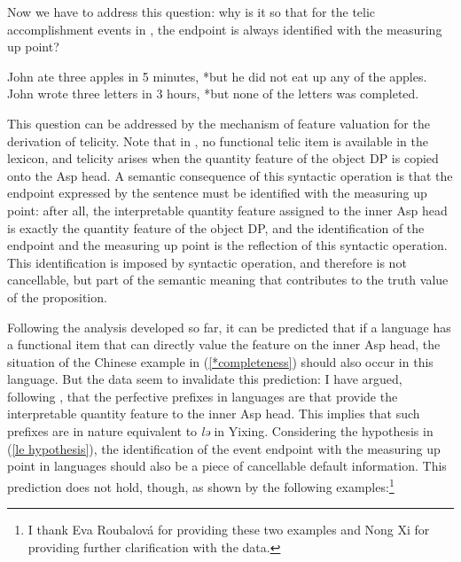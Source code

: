 \documentclass[output=paper]{langsci/langscibook}
\begin{document}
Now we have to address this question: why is it so that for the telic accomplishment events in , the endpoint is always identified with the measuring up point?

\begin{exe}
\ex John ate three apples in 5 minutes, *but he did not eat up any of the apples.
\ex John wrote three letters in 3 hours, *but none of the letters was completed.
\end{exe}

This question can be addressed by the mechanism of feature valuation for the derivation of telicity. Note that in , no functional telic item is available in the lexicon, and telicity arises when the quantity feature of the object DP is copied onto the Asp head. A semantic consequence of this syntactic operation is that the endpoint expressed by the sentence must be identified with the measuring up point: after all, the interpretable quantity feature assigned to the inner Asp head is exactly the quantity feature of the object DP, and the identification of the endpoint and the measuring up point is the reflection of this syntactic operation. This identification is imposed by syntactic operation, and therefore is not cancellable, but part of the semantic meaning that contributes to the truth value of the proposition.


Following the analysis developed so far, it can be predicted that if a language
has a functional item that can directly value the feature on the inner
Asp head, the situation of the Chinese example in (\ref{*completeness})
should also occur in this language. But the  data seem to invalidate this
prediction: I have argued, following \textcite{Borer2005b}, that the perfective
prefixes in  languages are  that provide the
interpretable quantity feature to the inner Asp head. This implies that
such prefixes are in nature equivalent to \emph{lə} in Yixing. Considering the
hypothesis in (\ref{le hypothesis}), the identification of the event endpoint
with the measuring up point in  languages should also be a piece of
cancellable default information. This prediction does not hold, though, as
shown by the following  examples:\footnote{I thank Eva Roubalov\'a for
providing these two examples and Nong Xi for providing further clarification
with the data.}
\end{document}
